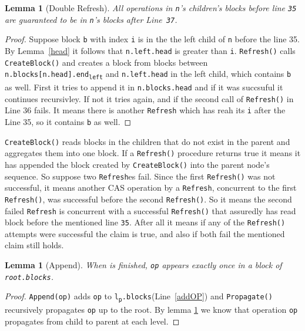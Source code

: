 \documentclass[10pt]{article}
\newtheorem{lemma}[theorem]{Lemma}
\theoremstyle{definition}
\begin{document}
\begin{lemma}[Double Refresh] \label{doublyRefresh}
All operations in \texttt{n}'s children's blocks before line \texttt{35} are guaranteed to be in \texttt{n}'s blocks after Line~\texttt{37}.
\end{lemma}
\begin{proof}
Suppose block \texttt{b} with index \texttt{i} is in the the left child of \texttt{n} before the line 35. By Lemma~\ref{head} it follows that \texttt{n.left.head} is greater than \texttt{i}. \texttt{Refresh()} calls \texttt{CreateBlock()} and creates a block from blocks between \texttt{n.blocks[n.head].end\textsubscript{left}} and \texttt{n.left.head} in the left child, which contains \texttt{b} as well. First it tries to append it in \texttt{n.blocks.head} and if it was succsuful it continues recursivley. If not it tries again, and if the second call of \texttt{Refresh()} in Line 36 fails. It means there is another \texttt{Refresh} which has reah its \texttt{i} after the Line 35, so it contains \texttt{b} as well.
\end{proof}
\texttt{CreateBlock()} reads blocks in the children that do not exist in the parent and aggregates them into one block. If a \texttt{Refresh()} procedure returns true it means it has appended the block created by \texttt{CreateBlock()} into the parent node's sequence. So suppose two \texttt{Refresh}es fail. Since the first \texttt{Refresh()} was not successful, it means another CAS operation by a \texttt{Refresh}, concurrent to the first \texttt{Refresh()}, was successful before the second \texttt{Refresh()}. So it means the second failed \texttt{Refresh} is concurrent with a successful \texttt{Refresh()} that assuredly has read block before the mentioned line \texttt{35}. After all it means if any of the \texttt{Refresh()} attempts were successful the claim is true, and also if both fail the mentioned claim still holds.

\begin{lemma}[Append]\label{append}
 When  is finished, \texttt{op} appears exactly once in a block of \texttt{root.blocks}.
\end{lemma}
\begin{proof}
\texttt{Append(op)} adds \texttt{op} to \texttt{l\textsubscript{p}.blocks}(Line~\ref{addOP}) and \texttt{Propagate()} recursively propagates \texttt{op} up to the root.
By lemma \ref{doublyRefresh} we know that operation \texttt{op} propagates from child to parent at each level.
\end{proof}
\end{document}
